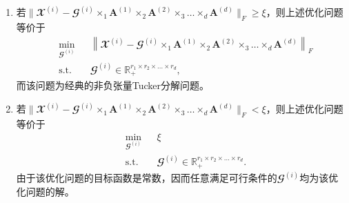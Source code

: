 \begin{enumerate}[label=\emph{情形\arabic*},leftmargin=2\parindent]
    \item 若$\|\mathbfcal{X}^{(i)}-\mathbfcal{G}^{(i)} \times_{1} \boldsymbol{A}^{(1)} \times_{2} \boldsymbol{A}^{(2)}\times_{3} \ldots \times_{d} \boldsymbol{A}^{(d)}\|_{F}\geq\xi$，则上述优化问题等价于
    \begin{equation*}
        \begin{aligned}
            &\underset{{\mathbfcal{G}^{(i)}}}{\min} && \left\|\mathbfcal{X}^{(i)}-\mathbfcal{G}^{(i)} \times_{1} \boldsymbol{A}^{(1)}\times_{2} \boldsymbol{A}^{(2)}\times_{3}  \ldots \times_{d} \boldsymbol{A}^{(d)}\right\|_{F} \\ &\text{s.t.} && \mathbfcal{G}^{(i)}\in\mathbb{R}_{+}^{r_1 \times r_2 \times \ldots \times r_d},
        \end{aligned}
    \end{equation*}
    而该问题为经典的非负张量Tucker分解问题。
    \item 若$\|\mathbfcal{X}^{(i)}-\mathbfcal{G}^{(i)} \times_{1} \boldsymbol{A}^{(1)} \times_{2} \boldsymbol{A}^{(2)}\times_{3} \ldots \times_{d} \boldsymbol{A}^{(d)}\|_{F}<\xi$，则上述优化问题等价于
    \begin{equation*}
        \begin{aligned}
            &\underset{{\mathbfcal{G}^{(i)}}}{\min} && \xi \\ &\text{s.t.} && \mathbfcal{G}^{(i)}\in\mathbb{R}_{+}^{r_1 \times r_2 \times \ldots \times r_d}.
        \end{aligned}
    \end{equation*}
    由于该优化问题的目标函数是常数，因而任意满足可行条件的$\mathbfcal{G}^{(i)}$均为该优化问题的解。
    
\end{enumerate}

